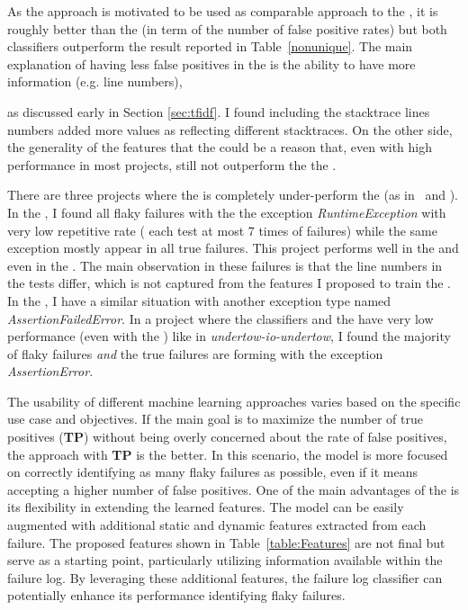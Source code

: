 As the \tfidf approach is motivated to be used as comparable approach to the \classifier, it is roughly better than the \classifier (in term of the number of false positive rates) but both classifiers outperform the \syntax result reported in Table~\ref{nonunique}. The main explanation of having less false positives in the \tfidf is the ability to have more information (e.g. line numbers), {as discussed early in Section \ref{sec:tfidf}. %
I found including the stacktrace lines numbers added more values as reflecting different stacktraces. 
On the other side, the generality of the features that the \classifier could be a reason that, even with high performance in most projects, still not outperform the the \tfidf. 




There are three projects where the \classifier is completely under-perform the \tfidf (as in \wildfly~and \exec).  In the \wildfly, I found all flaky failures with the the exception \emph{RuntimeException} with very low repetitive rate ( each test at most 7 times of failures) while the same exception mostly appear in all true failures. This project performs well in the \tfidf and even in the \syntax. The main observation in these failures is that the line numbers in the tests differ, which is not captured from the features I proposed to train the \classifier. In the \exec, I have a similar situation with another exception type named \emph{AssertionFailedError}. In a project where the classifiers and the \syntax have very low performance (even with the \tfidf) like in \emph{undertow-io-undertow}, I found the majority of flaky failures \emph{and} the true failures are forming with the exception \emph{AssertionError}. 


The usability of different machine learning approaches varies based on the specific use case and objectives. 
If the main goal is to maximize the number of true positives (\textbf{TP}) without being overly concerned about the rate of false positives, the approach with \textbf{TP} is the better. In this scenario, the model is more focused on correctly identifying as many flaky failures as possible, even if it means accepting a higher number of false positives.
One of the main advantages of the \classifier is its flexibility in extending the learned features. The model can be easily augmented with additional static and dynamic features extracted from each failure. The proposed features shown in Table~\ref{table:Features} are not final but serve as a starting point, particularly utilizing information available within the failure log. By leveraging these additional features, the failure log classifier can potentially enhance its performance identifying flaky failures.



}

